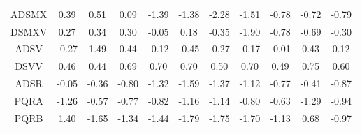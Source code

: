 \begin{longtable}{ | c || c | c | c | c | c | c | c | c | c || c |}
ADSMX &  \cellcolor[HTML]{F7F7FF} 0.39 &  \cellcolor[HTML]{EFEFFF} 0.51 &  \cellcolor[HTML]{FFFFFF} 0.09 &  \cellcolor[HTML]{FFDFDF} -1.39 &  \cellcolor[HTML]{FFDFDF} -1.38 &  \cellcolor[HTML]{FFC7C7} -2.28 &  \cellcolor[HTML]{FFD7D7} -1.51 &  \cellcolor[HTML]{FFEFEF} -0.78 &  \cellcolor[HTML]{FFEFEF} -0.72 &  \cellcolor[HTML]{FFEFEF} -0.79 \\
DSMXV &  \cellcolor[HTML]{F7F7FF} 0.27 &  \cellcolor[HTML]{F7F7FF} 0.34 &  \cellcolor[HTML]{F7F7FF} 0.30 &  \cellcolor[HTML]{FFFFFF} -0.05 &  \cellcolor[HTML]{F7F7FF} 0.18 &  \cellcolor[HTML]{FFF7F7} -0.35 &  \cellcolor[HTML]{FFCFCF} -1.90 &  \cellcolor[HTML]{FFEFEF} -0.78 &  \cellcolor[HTML]{FFEFEF} -0.69 &  \cellcolor[HTML]{FFF7F7} -0.30 \\
ADSV &  \cellcolor[HTML]{FFF7F7} -0.27 &  \cellcolor[HTML]{D7D7FF} 1.49 &  \cellcolor[HTML]{F7F7FF} 0.44 &  \cellcolor[HTML]{FFFFFF} -0.12 &  \cellcolor[HTML]{FFF7F7} -0.45 &  \cellcolor[HTML]{FFF7F7} -0.27 &  \cellcolor[HTML]{FFF7F7} -0.17 &  \cellcolor[HTML]{FFFFFF} -0.01 &  \cellcolor[HTML]{F7F7FF} 0.43 &  \cellcolor[HTML]{FFFFFF} 0.12 \\
DSVV &  \cellcolor[HTML]{F7F7FF} 0.46 &  \cellcolor[HTML]{F7F7FF} 0.44 &  \cellcolor[HTML]{EFEFFF} 0.69 &  \cellcolor[HTML]{EFEFFF} 0.70 &  \cellcolor[HTML]{EFEFFF} 0.70 &  \cellcolor[HTML]{EFEFFF} 0.50 &  \cellcolor[HTML]{EFEFFF} 0.70 &  \cellcolor[HTML]{EFEFFF} 0.49 &  \cellcolor[HTML]{EFEFFF} 0.75 &  \cellcolor[HTML]{EFEFFF} 0.60 \\
ADSR &  \cellcolor[HTML]{FFFFFF} -0.05 &  \cellcolor[HTML]{FFF7F7} -0.36 &  \cellcolor[HTML]{FFE7E7} -0.80 &  \cellcolor[HTML]{FFDFDF} -1.32 &  \cellcolor[HTML]{FFD7D7} -1.59 &  \cellcolor[HTML]{FFDFDF} -1.37 &  \cellcolor[HTML]{FFDFDF} -1.12 &  \cellcolor[HTML]{FFEFEF} -0.77 &  \cellcolor[HTML]{FFF7F7} -0.41 &  \cellcolor[HTML]{FFE7E7} -0.87 \\
PQRA &  \cellcolor[HTML]{FFDFDF} -1.26 &  \cellcolor[HTML]{FFEFEF} -0.57 &  \cellcolor[HTML]{FFEFEF} -0.77 &  \cellcolor[HTML]{FFE7E7} -0.82 &  \cellcolor[HTML]{FFDFDF} -1.16 &  \cellcolor[HTML]{FFDFDF} -1.14 &  \cellcolor[HTML]{FFE7E7} -0.80 &  \cellcolor[HTML]{FFEFEF} -0.63 &  \cellcolor[HTML]{FFDFDF} -1.29 &  \cellcolor[HTML]{FFE7E7} -0.94 \\
PQRB &  \cellcolor[HTML]{DFDFFF} 1.40 &  \cellcolor[HTML]{FFD7D7} -1.65 &  \cellcolor[HTML]{FFDFDF} -1.34 &  \cellcolor[HTML]{FFD7D7} -1.44 &  \cellcolor[HTML]{FFCFCF} -1.79 &  \cellcolor[HTML]{FFCFCF} -1.75 &  \cellcolor[HTML]{FFD7D7} -1.70 &  \cellcolor[HTML]{FFDFDF} -1.13 &  \cellcolor[HTML]{EFEFFF} 0.68 &  \cellcolor[HTML]{FFE7E7} -0.97 \\

\end{longtable}
